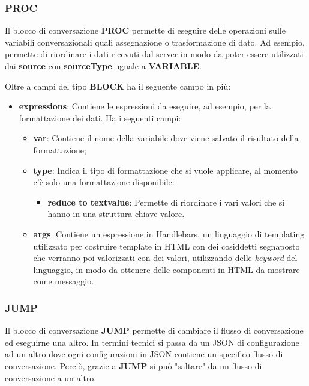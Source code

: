 \subsubsection{PROC}
Il blocco di conversazione \textbf{PROC} permette di eseguire delle operazioni sulle variabili conversazionali quali assegnazione o trasformazione di dato. Ad esempio, permette di riordinare i dati ricevuti dal server in modo da poter essere utilizzati dai \textbf{source} con \textbf{sourceType} uguale a \textbf{VARIABLE}.


Oltre a campi del tipo \textbf{BLOCK} ha il seguente campo in più:

\begin{itemize}
	\item \textbf{expressions}: Contiene le espressioni da eseguire, ad esempio, per la formattazione dei dati.
	Ha i seguenti campi:
	\begin{itemize}
		\item \textbf{var}: Contiene il nome della variabile dove viene salvato il risultato della formattazione;
		\item \textbf{type}: Indica il tipo di formattazione che si vuole applicare, al momento c'è solo una formattazione disponibile:
		\begin{itemize}
			\item \textbf{reduce to textvalue}: Permette di riordinare i vari valori che si hanno in una struttura chiave valore.
		\end{itemize}
		\item \textbf{args}: Contiene un espressione in \textsf{Handlebars}, un linguaggio di templating utilizzato per costruire template in HTML con dei cosiddetti segnaposto che verranno poi valorizzati con dei valori, utilizzando delle \emph{keyword} del linguaggio, in modo da ottenere delle componenti in HTML da mostrare come messaggio.
	\end{itemize}
\end{itemize}

\subsubsection{JUMP}

Il blocco di conversazione \textbf{JUMP} permette di cambiare il flusso di conversazione ed eseguirne una altro. In termini tecnici si passa da un JSON di configurazione ad un altro dove ogni configurazioni in JSON contiene un specifico flusso di conversazione. Perciò, grazie a \textbf{JUMP} si può "saltare" da un flusso di conversazione a un altro.

